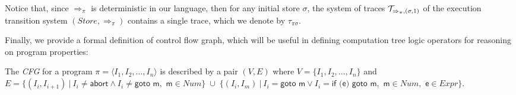 \noindent Notice that, since $\Rightarrow_{\pi}$ is deterministic in our language, then for any initial store $\sigma$, the system of traces ${\cal T}_{\Rightarrow_{\pi},(\sigma,1)}$ of the execution transition system $(Store,\Rightarrow_{\pi})$ contains a single trace, which we denote by $\tau_{\pi\sigma}$.

Finally, we provide a formal definition of control flow graph, which will be useful in defining computation tree logic operators for reasoning on program properties:

\begin{definition}
\label{de:cfg}
The {\em CFG} for a program $\pi=\langle I_1, I_2, \ldots, I_n \rangle$ is described by a pair $(V, E)$ where $V = \{ I_1, I_2, \ldots, I_n \}$ and 
$E = \{(I_i, I_{i+1})\:|\: I_i \neq \textsf{abort} \wedge I_i \neq \textsf{goto m}, \!\textsf{ m}\in Num \}\;\cup\;\{(I_i, I_m)\:|\: I_i = \textsf{goto m} \vee I_i = \textsf{if (e) goto m}, \!\textsf{ m}\in Num, \!\textsf{ e}\in Expr \}$.
\end{definition}


